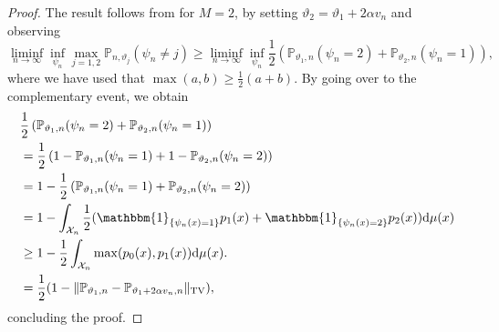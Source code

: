 \documentclass[a4paper]{article}
\begin{document}
\begin{proof}
The result follows from  for $M=2$, by setting $\vartheta_2=\vartheta_1 + 2 \alpha v_n$ and observing
\begin{equation*}
\liminf_{n\rightarrow \infty} \inf_{\psi_n} \max_{j=1,2}\mathbb{P}_{n,\vartheta_j}(\psi_n \neq j) \geq \liminf_{n\rightarrow \infty} \inf_{\psi_n} \frac{1}{2}\left(\mathbb{P}_{\vartheta_1,n}(\psi_n = 2) + \mathbb{P}_{\vartheta_2, n}(\psi_n = 1)\right),
\end{equation*}
where we have used that $\max(a,b) \geq \frac{1}{2}(a+b)$. By going over to the complementary event, we obtain
\begin{equation*}
\begin{aligned}
&\frac{1}{2}\left(\mathbb{P}_{\vartheta_1,n}(\psi_n = 2) + \mathbb{P}_{\vartheta_2, n}(\psi_n = 1)\right) \\
&=\frac{1}{2}\left( 1 - \mathbb{P}_{\vartheta_1,n}(\psi_n=1) + 1- \mathbb{P}_{\vartheta_2,n}(\psi_n=2)\right)\\
&=1 - \frac{1}{2}\left(\mathbb{P}_{\vartheta_1,n}(\psi_n=1)+ \mathbb{P}_{\vartheta_2,n}(\psi_n=2)\right)\\
&=1 - \int_{\mathcal{X}_n} \frac{1}{2}(\mathbbm{1}_{\{\psi_{n}(x)=1\}
}p_1(x) + \mathbbm{1}_{\{\psi_{n}(x)=2\}
}p_2(x) ) \mathrm{d}\mu(x)\\
&\geq 1 - \frac{1}{2}\int_{\mathcal{X}_n} \max(p_0(x), p_1(x))\mathrm{d}\mu(x). \\
&= \frac{1}{2}(1-\Vert \mathbb{P}_{\vartheta_1,n} -  \mathbb{P}_{\vartheta_1 + 2\alpha v_n, n}\Vert_{\mathrm{TV}}),
\end{aligned}
\end{equation*}
concluding the proof. 
\end{proof}






\end{document}

